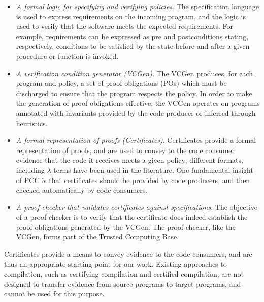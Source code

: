 \begin{itemize}
\item\emph{A formal logic for specifying and verifying policies}. The
specification language is used to express requirements on the incoming
program, and the logic is used to verify that the software meets the
expected requirements. For example, requirements can be expressed as pre
and postconditions stating, respectively, conditions to be satisfied
by the state before and after a given procedure or function is
invoked. 

\item\emph{A verification condition generator (VCGen)}. The VCGen
produces, for each program and policy, a set of proof obligations
(POs) which must be discharged to ensure that the program respects the
policy.  In order to make the generation of proof obligations
effective, the VCGen operates on programs annotated with invariants
provided by the code producer or inferred through heuristics.


\item\emph{A formal representation of proofs (Certificates)}.
Certificates provide a formal representation of proofs, and are used
to convey to the code consumer evidence that the code it receives
meets a given policy; different formats, including $\lambda$-terms
have been used in the literature.  One fundamental insight of PCC is
that certificates should be provided by code producers, and then
checked automatically by code consumers.



\item\emph{A proof checker that validates certificates against
specifications}.  The objective of a proof checker is to verify that
the certificate does indeed establish the proof obligations generated
by the VCGen. The proof checker, like the VCGen, forms part of the
Trusted Computing Base.


\end{itemize}
Certificates provide a means to convey evidence to the code consumers,
and are thus an appropriate starting point for our work.
Existing approaches to compilation, such as certifying compilation and
certified compilation, are not designed to transfer evidence from
source programs to target programs, and cannot be used for this
purpose.


